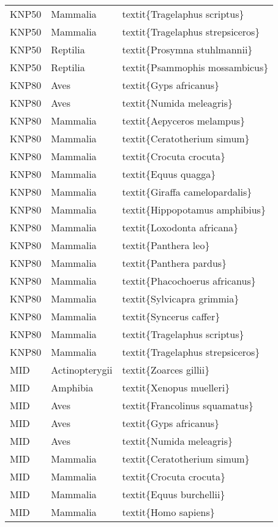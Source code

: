 \begin{longtable}{lll}
  KNP50 & Mammalia & textit\{Tragelaphus scriptus\} \\ 
  KNP50 & Mammalia & textit\{Tragelaphus strepsiceros\} \\ 
  KNP50 & Reptilia & textit\{Prosymna stuhlmannii\} \\ 
  KNP50 & Reptilia & textit\{Psammophis mossambicus\} \\ 
  KNP80 & Aves & textit\{Gyps africanus\} \\ 
  KNP80 & Aves & textit\{Numida meleagris\} \\ 
  KNP80 & Mammalia & textit\{Aepyceros melampus\} \\ 
  KNP80 & Mammalia & textit\{Ceratotherium simum\} \\ 
  KNP80 & Mammalia & textit\{Crocuta crocuta\} \\ 
  KNP80 & Mammalia & textit\{Equus quagga\} \\ 
  KNP80 & Mammalia & textit\{Giraffa camelopardalis\} \\ 
  KNP80 & Mammalia & textit\{Hippopotamus amphibius\} \\ 
  KNP80 & Mammalia & textit\{Loxodonta africana\} \\ 
  KNP80 & Mammalia & textit\{Panthera leo\} \\ 
  KNP80 & Mammalia & textit\{Panthera pardus\} \\ 
  KNP80 & Mammalia & textit\{Phacochoerus africanus\} \\ 
  KNP80 & Mammalia & textit\{Sylvicapra grimmia\} \\ 
  KNP80 & Mammalia & textit\{Syncerus caffer\} \\ 
  KNP80 & Mammalia & textit\{Tragelaphus scriptus\} \\ 
  KNP80 & Mammalia & textit\{Tragelaphus strepsiceros\} \\ 
  MID & Actinopterygii & textit\{Zoarces gillii\} \\ 
  MID & Amphibia & textit\{Xenopus muelleri\} \\ 
  MID & Aves & textit\{Francolinus squamatus\} \\ 
  MID & Aves & textit\{Gyps africanus\} \\ 
  MID & Aves & textit\{Numida meleagris\} \\ 
  MID & Mammalia & textit\{Ceratotherium simum\} \\ 
  MID & Mammalia & textit\{Crocuta crocuta\} \\ 
  MID & Mammalia & textit\{Equus burchellii\} \\ 
  MID & Mammalia & textit\{Homo sapiens\} \\ 

\end{longtable}
